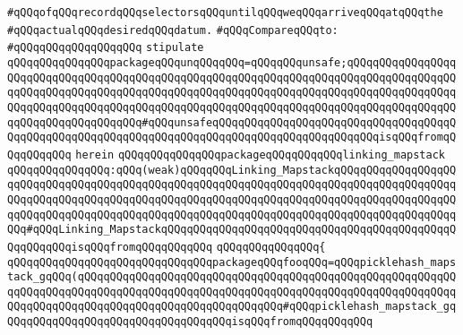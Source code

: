 \verb|#qQQqofqQQqrecordqQQqselectorsqQQquntilqQQqweqQQqarriveqQQqatqQQqthe|\newline
\verb|#qQQqactualqQQqdesiredqQQqdatum.|\newline
\newline
\newline
\verb|#qQQqCompareqQQqto:|\newline
\verb|#qQQqqQQqqQQqqQQqqQQq|\newline
\newline
\verb|stipulate|\newline
\verb|qQQqqQQqqQQqqQQqpackageqQQqunqQQqqQQq=qQQqqQQqunsafe;qQQqqQQqqQQqqQQqqQQqqQQqqQQqqQQqqQQqqQQqqQQqqQQqqQQqqQQqqQQqqQQqqQQqqQQqqQQqqQQqqQQqqQQqqQQqqQQqqQQqqQQqqQQqqQQqqQQqqQQqqQQqqQQqqQQqqQQqqQQqqQQqqQQqqQQqqQQqqQQqqQQqqQQqqQQqqQQqqQQqqQQqqQQqqQQqqQQqqQQqqQQqqQQqqQQqqQQqqQQqqQQqqQQqqQQqqQQqqQQqqQQqqQQq#qQQqunsafeqQQqqQQqqQQqqQQqqQQqqQQqqQQqqQQqqQQqqQQqqQQqqQQqqQQqqQQqqQQqqQQqqQQqqQQqqQQqqQQqqQQqqQQqqQQqqQQqisqQQqfromqQQqqQQqqQQq|\newline
\verb|herein|\newline
\newline
\verb|qQQqqQQqqQQqqQQqpackageqQQqqQQqqQQqlinking_mapstack|\newline
\verb|qQQqqQQqqQQqqQQq:qQQq(weak)qQQqqQQqLinking_MapstackqQQqqQQqqQQqqQQqqQQqqQQqqQQqqQQqqQQqqQQqqQQqqQQqqQQqqQQqqQQqqQQqqQQqqQQqqQQqqQQqqQQqqQQqqQQqqQQqqQQqqQQqqQQqqQQqqQQqqQQqqQQqqQQqqQQqqQQqqQQqqQQqqQQqqQQqqQQqqQQqqQQqqQQqqQQqqQQqqQQqqQQqqQQqqQQqqQQqqQQqqQQqqQQqqQQqqQQqqQQqqQQqqQQqqQQq#qQQqLinking_MapstackqQQqqQQqqQQqqQQqqQQqqQQqqQQqqQQqqQQqqQQqqQQqqQQqqQQqqQQqisqQQqfromqQQqqQQqqQQq|\newline
\verb|qQQqqQQqqQQqqQQq{|\newline
\verb|qQQqqQQqqQQqqQQqqQQqqQQqqQQqqQQqpackageqQQqfooqQQq=qQQqpicklehash_mapstack_gqQQq(qQQqqQQqqQQqqQQqqQQqqQQqqQQqqQQqqQQqqQQqqQQqqQQqqQQqqQQqqQQqqQQqqQQqqQQqqQQqqQQqqQQqqQQqqQQqqQQqqQQqqQQqqQQqqQQqqQQqqQQqqQQqqQQqqQQqqQQqqQQqqQQqqQQqqQQqqQQqqQQqqQQqqQQqqQQq#qQQqpicklehash_mapstack_gqQQqqQQqqQQqqQQqqQQqqQQqqQQqqQQqqQQqisqQQqfromqQQqqQQqqQQq|\newline
